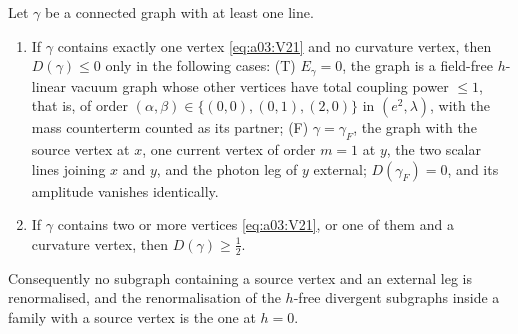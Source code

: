 \begin{lemma}\label{lem:a03:PC}
Let $\gamma$ be a connected graph with at least one line.
\begin{enumerate}[label=\textup{(\roman*)},nosep]
\item If $\gamma$ contains exactly one vertex \eqref{eq:a03:V21} and no curvature vertex, then $D(\gamma)\le0$ only in the following cases: \textup{(T)} $E_\gamma=0$, the graph is a field-free $h$-linear vacuum graph whose other vertices have total coupling power $\le1$, that is, of order $(\alpha,\beta)\in\{(0,0),(0,1),(2,0)\}$ in $(e^2,\lambda)$, with the mass counterterm counted as its partner; \textup{(F)} $\gamma=\gamma_F$, the graph with the source vertex at $x$, one current vertex of order $m=1$ at $y$, the two scalar lines joining $x$ and $y$, and the photon leg of $y$ external; $D(\gamma_F)=0$, and its amplitude vanishes identically.
\item If $\gamma$ contains two or more vertices \eqref{eq:a03:V21}, or one of them and a curvature vertex, then $D(\gamma)\ge\frac12$.
\end{enumerate}
Consequently no subgraph containing a source vertex and an external leg is renormalised, and the renormalisation of the $h$-free divergent subgraphs inside a family with a source vertex is the one at $h=0$.
\end{lemma}

